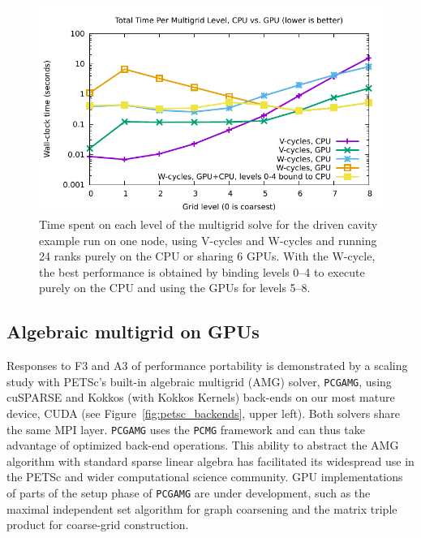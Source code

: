\documentclass[5p,times]{elsarticle}
\begin{document}
\begin{figure}
    \centering
    \includegraphics[width=.95 \columnwidth]{figures/snes-ex19/combined-cpu_vs_gpu_by_level.pdf}
    \caption{Time spent on each level of the multigrid solve for the 
    driven cavity example run on one node, using V-cycles and W-cycles and
    running 24 ranks purely on the CPU or sharing 6 GPUs.
    With the W-cycle, the best performance is obtained by binding levels
    0--4 to execute purely on the CPU and using the GPUs for levels 5--8.
    }
    \label{fig:ex19-full-node}
\end{figure}


\subsection{Algebraic multigrid on GPUs}
\label{subsec:gamg}

Responses to F3 and A3  of performance portability is demonstrated by a scaling study with PETSc's built-in algebraic multigrid (AMG) solver, {\tt PCGAMG}, using cuSPARSE and Kokkos (with Kokkos Kernels) back-ends on our most mature device, CUDA (see Figure~\ref{fig:petsc_backends}, upper left). Both solvers share the same MPI layer.
{\tt PCGAMG} uses the {\tt PCMG} framework and can thus
take advantage of optimized back-end operations.
This ability to abstract the AMG algorithm with standard sparse linear algebra has facilitated its widespread use in the PETSc and wider computational science community.
GPU implementations of parts of the setup phase of {\tt PCGAMG} are under development,
such as the maximal independent set algorithm for graph coarsening and the matrix triple product for coarse-grid construction.
\end{document}
